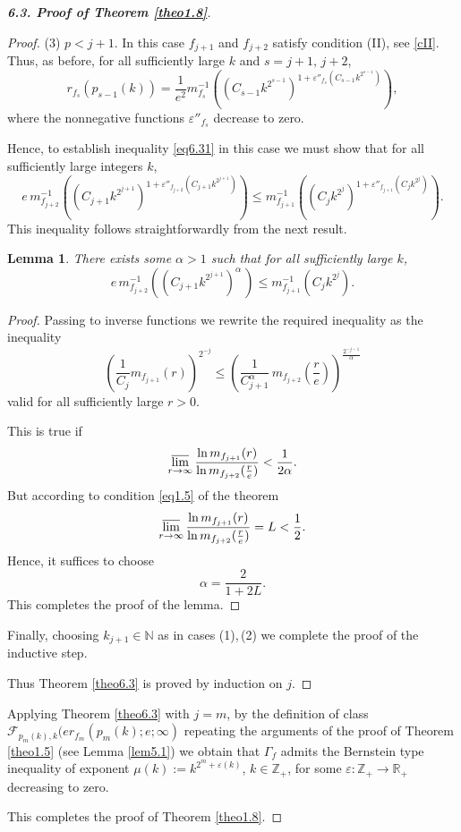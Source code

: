 \documentclass[11pt, oneside]{amsart}
\newtheorem{Lm}[Th]{Lemma}
\begin{document}
\begin{proof}[{\bf 6.3. Proof of Theorem \ref{theo1.8}}]
\begin{proof}
(3) $p<j+1$. In this case $f_{j+1}$ and $f_{j+2}$ satisfy condition (II), see \eqref{cII}. Thus, as before, for all sufficiently large $k$ and $s=j+1,\, j+2$,
\[
r_{f_{s}}(p_{s-1}(k))=\frac{1}{e^2}m_{f_{s}}^{-1}\left(\left(C_{s-1} k^{2^{s-1}}\right)^{1+\varepsilon''_{f_{s}}(C_{s-1} k^{2^{s-1}})}\right),
\]
where the nonnegative functions $\varepsilon''_{f_{s}}$ decrease to zero.

Hence, to establish inequality \eqref{eq6.31} in this case we must show that for all sufficiently large integers $k$,
\[
e\, m_{f_{j+2}}^{-1}\left(\left(C_{j+1} k^{2^{j+1}}\right)^{1+\varepsilon''_{f_{j+2}}(C_{j+1} k^{2^{j+1}})}\right)\le m_{f_{j+1}}^{-1}\left(\left(C_{j} k^{2^{j}}\right)^{1+\varepsilon''_{f_{j+1}}(C_{j} k^{2^{j}})}\right).
\]
This inequality follows straightforwardly from the next result.
\begin{Lm}\label{lem6.6}
There exists some $\alpha>1$ such that for all sufficiently large $k$,
\[
e\, m_{f_{j+2}}^{-1}\left(\left(C_{j+1} k^{2^{j+1}}\right)^{\alpha}\,\right)\le m_{f_{j+1}}^{-1}\left(C_{j} k^{2^{j}}\right).
\]
\end{Lm}
\begin{proof}
Passing to inverse functions we rewrite the required inequality as the inequality
\[
\left(\frac{1}{C_j}m_{f_{j+1}}(r)\right)^{2^{-j}}\le \left(\frac{1}{C_{j+1}^{\alpha}}\,m_{f_{j+2}}\left(\frac re\right)\right)^{\frac{2^{-j-1}}{\alpha}}
\]
valid for all sufficiently large $r>0$.

This is true if 
\[
\varlimsup_{r\rightarrow\infty}\frac{\ln m_{f_{j+1}}(r)}{\ln m_{f_{j+2}}(\frac re)}<\frac{1}{2\alpha}.
\]
But according to  condition \eqref{eq1.5} of the theorem
\[
\varlimsup_{r\rightarrow\infty}\frac{\ln m_{f_{j+1}}(r)}{\ln m_{f_{j+2}}(\frac re)}=L<\frac{1}{2}.
\]
Hence, it suffices to choose
\[
\alpha=\frac{2}{1+2L}.
\]
This completes the proof of the lemma.
\end{proof}
Finally, choosing $k_{j+1}\in\mathbb N$ as in cases (1),\,(2) we complete the proof of the inductive step.

Thus Theorem \ref{theo6.3} is proved by induction on $j$. 
\end{proof}

Applying Theorem \ref{theo6.3} with $j=m$, by the definition of class $\mathcal F_{p_{m}(k),k}(er_{f_{m}}(p_{m}(k);e;\infty)$ repeating the arguments of the proof of Theorem \ref{theo1.5} (see Lemma \ref{lem5.1}) we obtain that $\Gamma_f$ admits the Bernstein type inequality of exponent $\mu(k):=k^{2^{m}+\varepsilon(k)}$, $k\in\mathbb Z_+$, for some $\varepsilon:\mathbb Z_+\rightarrow\mathbb R_+$ decreasing to zero.

This completes the proof of Theorem \ref{theo1.8}.
\end{proof}
\end{document}
